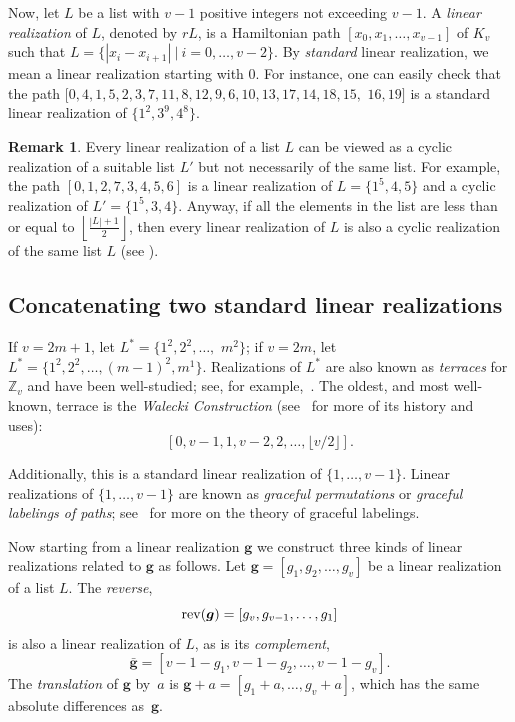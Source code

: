 \documentclass{amsart}
\theoremstyle{definition}
\newtheorem{rem}[prop]{Remark}
\numberwithin{equation}{section}
\newcommand{\rev}{\mathop{\rm rev}\nolimits}
\def\Z{\mathbb{Z}}
\begin{document}
Now, let $L$ be a list with $v-1$ positive integers not exceeding
$v-1$.
A \emph{linear realization} of  $L$, denoted by $rL$, is a Hamiltonian path
$[x_0,x_1,\ldots,x_{v-1}]$ of $K_v$
such that $L=\{|x_i-x_{i+1}|\ |\ i=0,\ldots,v-2\}$.
By \emph{standard} linear realization, we mean a linear realization starting with $0$.
For instance, one can easily check that the path $[0,4,1,5,2,3,7,11,8,12,9,6,10,13,17,14,18,15,$ $16,19]$ is a standard
linear realization
of $\{1^2,3^9,4^8\}$.


\begin{rem}\label{cyclin}
Every linear realization of a list $L$ can be viewed as a
cyclic realization of a suitable list $L'$ but not necessarily of the same list. For example, the path
$[0,1,2,7,3,4,5,6]$
 is a linear realization of $L=\{1^5,4,5\}$ and a cyclic realization of $L'=\{1^5,3,4\}$.
Anyway, if all the elements in the list are less than or equal to $\left\lfloor\frac{|L|+1}{2}\right\rfloor$, then every
linear realization of $L$ is
also a cyclic realization of the same list $L$ (see \cite[Section 3]{HR}).
\end{rem}

\subsection{Concatenating two standard linear realizations}

If $v = 2m+1$, let $L^* = \{ 1^2, 2^2, \ldots,$ $m^2 \}$; if $v=2m$, let $L^* = \{ 1^2, 2^2, \ldots, (m-1)^2, m^1 \}$.
Realizations of $L^*$ are also known as \emph{terraces} for $\Z_v$ and have been well-studied; see, for example,~\cite{OllisSurvey}.
The oldest, and most well-known, terrace is the \emph{Walecki Construction} (see~\cite{Alspach08} for more of its history and uses):
$$ [ 0, v-1, 1, v-2,2, \ldots, \lfloor v/2 \rfloor ].$$

Additionally, this is a standard linear realization of $\{ 1, \ldots, v-1 \}$.  Linear realizations of $\{ 1, \ldots, v-1 \}$ are  known as
\emph{graceful permutations} or \emph{graceful labelings of paths}; see~\cite{GallianSurvey} for more on the theory of graceful
labelings.

Now starting from a linear realization $\bm{g}$ we construct three kinds of linear realizations related to $\bm{g}$
as follows.
Let $\bm{g} = [g_1, g_2, \ldots, g_v]$ be a linear realization of a list $L$.  The
\emph{reverse}, $$\rev(\bm{g}) = [g_v, g_{v-1}, \ldots, g_1]$$ is also a linear realization of $L$,
as is its {\em complement}, $$\bm{\bar{g}} = [v-1-g_1,  v-1-g_2, \ldots, v -1 - g_v].$$
The \emph{translation} of  $\bm{g}$  by~$a$ is
$\bm{g} + a = [g_1+ a,  \ldots, g_v+ a ]$, which has the same absolute differences as~$\bm{g}$.
\end{document}
